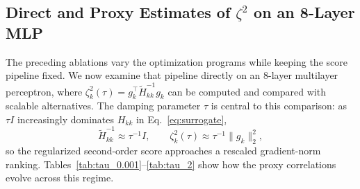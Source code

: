 \documentclass[accepted]{uai2026}%
\theoremstyle{remark}%
\begin{document}
\subsection{Direct and Proxy Estimates of $\zeta^2$ on an 8-Layer MLP}
The preceding ablations vary the optimization programs while keeping the score
pipeline fixed. We now examine that pipeline directly on an 8-layer
multilayer perceptron, where
$\zeta_k^2(\tau)=g_k^\top\widetilde H_{kk}^{-1}g_k$ can be computed and
compared with scalable alternatives. The damping parameter $\tau$ is central
to this comparison: as $\tau I$ increasingly dominates $H_{kk}$ in
Eq.~\eqref{eq:surrogate},
\[
\widetilde H_{kk}^{-1}\approx \tau^{-1}I,
\qquad
\zeta_k^2(\tau)\approx \tau^{-1}\|g_k\|_2^2,
\]
so the regularized second-order score approaches a rescaled gradient-norm
ranking. Tables~\ref{tab:tau_0.001}--\ref{tab:tau_2} show how the proxy
correlations evolve across this regime.
\end{document}

